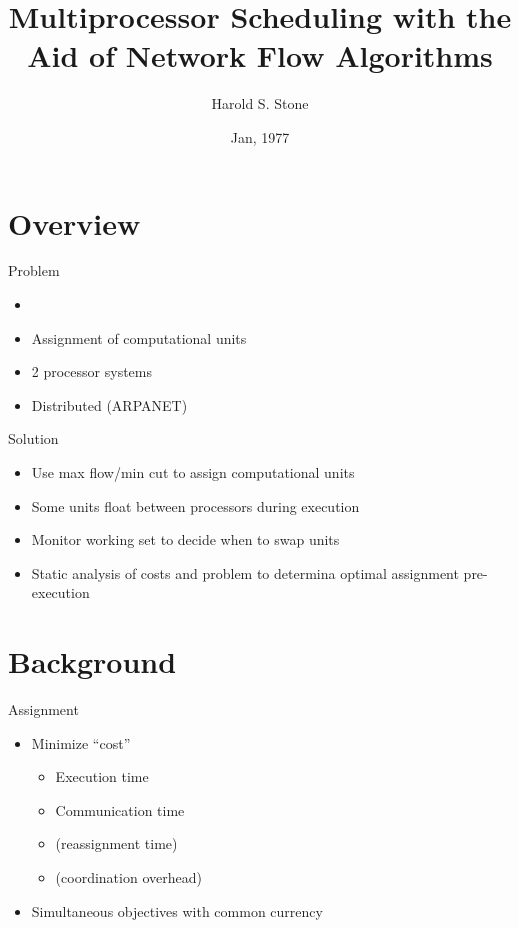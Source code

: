\documentclass{beamer}
\title{Multiprocessor Scheduling with the Aid of Network Flow Algorithms}
\author{Harold S. Stone}
\institute{Member, IEEE}
\date{Jan, 1977}
\begin{document}
\begin{frame}
\titlepage
\end{frame}

\section{Overview}

\begin{frame}{Problem}
\begin{itemize}
	\item \cite{sto77}
	\item Assignment of computational units
	\item 2 processor systems
	\item Distributed (ARPANET)
\end{itemize}
\end{frame}

\begin{frame}{Solution}
\begin{itemize}
	\item Use max flow/min cut to assign computational units
	\item Some units float between processors during execution
	\item Monitor working set to decide when to swap units
	\item Static analysis of costs and problem to determina optimal assignment pre-execution
\end{itemize}
\end{frame}

\section{Background}

\begin{frame}{Assignment}
\begin{itemize}
	\item Minimize ``cost''
	\begin{itemize}
		\item Execution time
		\item Communication time
		\item (reassignment time)
		\item (coordination overhead)
	\end{itemize}
	\item Simultaneous objectives with common currency
\end{itemize}
\end{frame}
\end{document}
